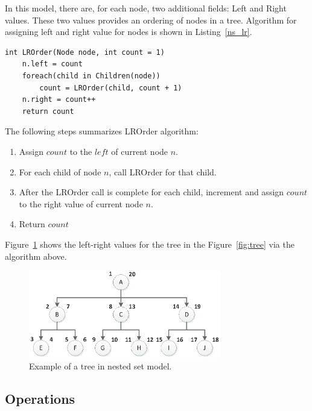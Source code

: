 In this model, there are, for each node, two additional fields: Left and Right values. These two values provides an ordering of nodes in a tree. Algorithm for assigning left and right value for nodes is shown in Listing~\ref{ns_lr}.

\begin{minipage}{\linewidth}
\begin{lstlisting}[frame=single]
int LROrder(Node node, int count = 1)
	n.left = count
	foreach(child in Children(node))
		count = LROrder(child, count + 1)
	n.right = count++
	return count
\end{lstlisting}	
\end{minipage}

The following steps summarizes LROrder algorithm:

\begin{enumerate}
\item Assign $count$ to the $left$ of current node $n$.
\item For each child of node $n$, call LROrder for that child.
\item After the LROrder call is complete for each child, increment and assign $count$ to the right value of current node $n$.
\item Return $count$
\end{enumerate}

Figure~\ref{fig:tree-lr} shows the left-right values for the tree in the Figure~\ref{fig:tree} via the algorithm above.

\begin{figure}[H]
\begin{center}
\includegraphics[width=3.3in]{images/tree-lr.eps}
\caption{Example of a tree in nested set model.\label{fig:tree-lr}}
\end{center}
\end{figure}

\subsection{Operations}

